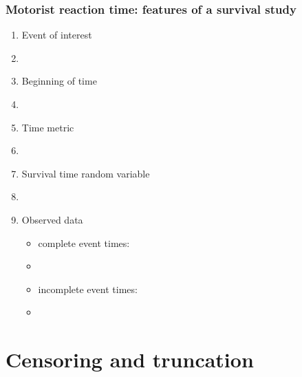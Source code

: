 \begin{frame}
\frametitle{Motorist reaction time: features of a survival study}
\begin{enumerate}
\item Event of interest %
\item[]
\item Beginning of time %
\item[]
\item Time metric %
\item[]
\item Survival time random variable %
\item[]
\item Observed data
\begin{itemize}
\item complete event times: %
\item[]
\item incomplete event times: %
\item[]
\end{itemize}
\end{enumerate}
\end{frame}

\section[Censoring and truncation]{Censoring and truncation}
\subsection{}
\begin{frame}
\end{frame}

